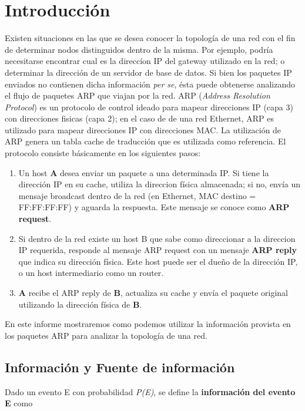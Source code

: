 \section{Introducción}

	
Existen situaciones en las que se desea conocer la topología de una red con el fin de determinar nodos distinguidos dentro de la misma.
Por ejemplo, podría necesitarse encontrar cual es la direccíon IP del gateway utilizado en la red; o determinar la dirección de un servidor de base de datos.
Si bien los paquetes IP enviados no contienen dicha información \textsl{per se}, ésta puede obtenerse analizando el flujo de paquetes ARP que viajan por la red. 
ARP (\textsl{Address Resolution Protocol}) es un protocolo de control ideado para mapear direcciones IP (capa 3) con direcciones fisicas (capa 2); en el caso de de una red Ethernet, ARP es utilizado para mapear direcciones IP con direcciones MAC.
La utilización de ARP genera un tabla cache de traducción que es utilizada como referencia. 
El protocolo consiste básicamente en los siguientes pasos:

\begin{enumerate}
	\item Un host \textbf{A} desea enviar un paquete a una determinada IP. Si tiene la dirección IP en su cache, utiliza la direccion física almacenada; si no, envía un mensaje broadcast dentro de la red (en Ethernet, MAC destino = FF:FF:FF:FF) y aguarda la respuesta. Este mensaje se conoce como \textbf{ARP request}.
	\item Si dentro de la red existe un host B que sabe como direccionar a la direccion IP requerida, responde al mensaje ARP request con un mensaje \textbf{ARP reply} que indica su dirección física. Este host puede ser el dueño de la dirección IP, o un host intermediario como un router.
	\item \textbf{A} recibe el ARP reply de \textbf{B}, actualiza su cache y envía el paquete original utilizando la dirección física de \textbf{B}.
\end{enumerate}

En este informe mostraremos como podemos utilizar la información provista en los paquetes ARP para analizar la topología de una red.

\subsection{Información y Fuente de información}

Dado un evento E con probabilidad \textsl{P(E)}, se define la \textbf{información del evento E} como

